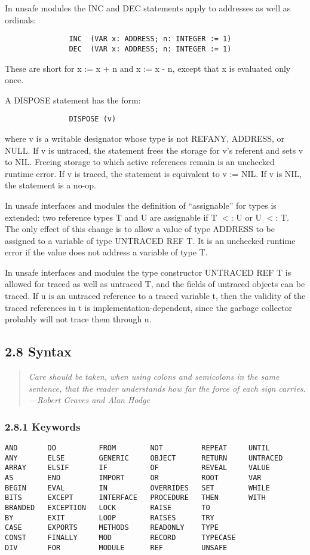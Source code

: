 \documentclass[10pt]{article}
\begin{document}
In unsafe modules the INC and DEC statements apply to addresses as well as
ordinals:
\begin{verbatim}
               INC  (VAR x: ADDRESS; n: INTEGER := 1)
               DEC  (VAR x: ADDRESS; n: INTEGER := 1)
\end{verbatim}
These are short for x := x + n and x := x - n, except that x is evaluated only
once.

A DISPOSE statement has the form:
\begin{verbatim}
               DISPOSE (v)
\end{verbatim}
where v is a writable designator whose type is not REFANY, ADDRESS, or
NULL. If v is untraced, the statement frees the storage for v's referent and
sets v to NIL. Freeing storage to which active references remain is an
unchecked runtime error. If v is traced, the statement is equivalent to v :=
NIL. If v is NIL, the statement is a no-op.

In unsafe interfaces and modules the definition of ``assignable'' for types is
extended: two reference types T and U are assignable if T $<$: U or U $<$:
T. The only effect of this change is to allow a value of type ADDRESS to be
assigned to a variable of type UNTRACED REF T. It is an unchecked runtime
error if the value does not address a variable of type T.

In unsafe interfaces and modules the type constructor UNTRACED REF T is
allowed for traced as well as untraced T, and the fields of untraced objects
can be traced. If u is an untraced reference to a traced variable t, then the
validity of the traced references in t is implementation-dependent, since the
garbage collector probably will not trace them through u.

\subsection*{2.8 Syntax}

\begin{quote}
  \emph{ Care should be taken, when using colons and semicolons in the same
    sentence, that the reader understands how far the force of each sign
    carries. ---Robert Graves and Alan Hodge }
\end{quote}

\subsubsection*{2.8.1 Keywords}

\begin{verbatim}
AND       DO          FROM        NOT         REPEAT     UNTIL
ANY       ELSE        GENERIC     OBJECT      RETURN     UNTRACED
ARRAY     ELSIF       IF          OF          REVEAL     VALUE
AS        END         IMPORT      OR          ROOT       VAR
BEGIN     EVAL        IN          OVERRIDES   SET        WHILE
BITS      EXCEPT      INTERFACE   PROCEDURE   THEN       WITH
BRANDED   EXCEPTION   LOCK        RAISE       TO
BY        EXIT        LOOP        RAISES      TRY
CASE      EXPORTS     METHODS     READONLY    TYPE
CONST     FINALLY     MOD         RECORD      TYPECASE
DIV       FOR         MODULE      REF         UNSAFE
\end{verbatim}
\end{document}
